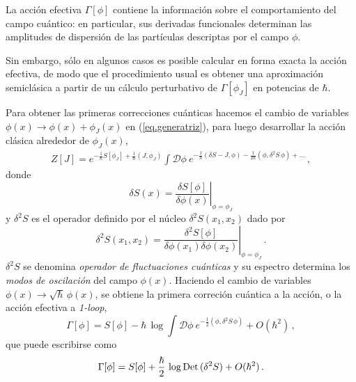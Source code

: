 La acción efectiva $\Gamma[\phi]$ contiene la información sobre el comportamiento del campo cuántico: en particular, sus derivadas funcionales determinan las amplitudes de dispersión de las partículas descriptas por el campo $\phi$.
\begin{comment}
Para demostrar esto se toma su derivada funcional evaluada en el campo medio $\phi _J $.
\begin{equation}
\frac{\delta \Gamma [ \phi _J ]}{\delta \phi _J (x) } = 
J(x) + \int dx ' \frac{\delta J [\phi _J ]}{\delta \phi _J (x) } \phi _J (x) - 
\frac{1}{Z[J]} \int dx' \frac{\delta Z[J] }{\delta J(x')} \frac{\delta J[\phi _J ]}{\delta \phi _J (x)} = J(x) \\[8pt]
\end{equation}
\end{comment}
Sin embargo, sólo en algunos casos es posible calcular en forma exacta la acción efectiva, de modo que el procedimiento usual es obtener una aproximación semiclásica a partir de un cálculo perturbativo de $\Gamma [ \phi _J]$ en potencias de $\hbar$.

Para obtener las primeras correcciones cuánticas hacemos el cambio de variables $\phi (x) \rightarrow \phi(x) + \phi _J (x) $ en (\ref{eq.generatriz}), para luego desarrollar la acción clásica alrededor de $\phi _J (x)$,
 \begin{equation}
\begin{array}{c}
Z[J] = e ^{- \frac{1}{\hbar} S[ \phi _J ] + \frac{1}{\hbar} (J, \phi _J )} 
\int \mathscr D \phi\ e ^{ - \frac{1}{\hbar} (\delta S  - J, \phi ) - \frac{1}{2 \hbar}  (\phi,\delta ^2 S\, \phi)+\ldots }\,,
\end{array}
\end{equation}
donde
\begin{equation}
\delta S(x) = \left. \frac{\delta S[\phi]}{ \delta \phi (x) } \right| _{\phi = \phi _J}
\end{equation}
y $\delta^2S$ es el operador definido por el núcleo $\delta ^2 S(x_1,x_2)$ dado por
\begin{equation}
		\delta ^2 S(x_1,x_2) = \left. \frac{\delta ^2 S[\phi]}{ \delta \phi (x_1) \delta \phi (x_2) } \right| _{\phi = \phi _J}\,.
\end{equation}
$\delta^2S$ se denomina {\it operador de fluctuaciones cuánticas} y su espectro determina los {\it modos de oscilación} del campo $\phi(x)$. Haciendo el cambio de variables $\phi (x) \rightarrow \sqrt{\hbar}\, \phi (x) $, se obtiene la primera correción cuántica a la  acción, o la acción efectiva a {\it 1-loop},
\begin{equation}
\Gamma [\phi] = S [ \phi] - 
\hbar\,\log\int \mathscr D \phi \ e ^{- \frac{1}{2}  (\phi, \delta ^2 S\, \phi) } + O(\hbar ^2)\,,
\end{equation}
que puede escribirse como
\begin{equation}\label{gama-det}
\Gamma [\phi] = S [\phi] + \frac{\hbar}{2}\, \log{\rm Det}\, ( \delta ^2 S ) +
O ( \hbar ^2 )\,.
\end{equation}

